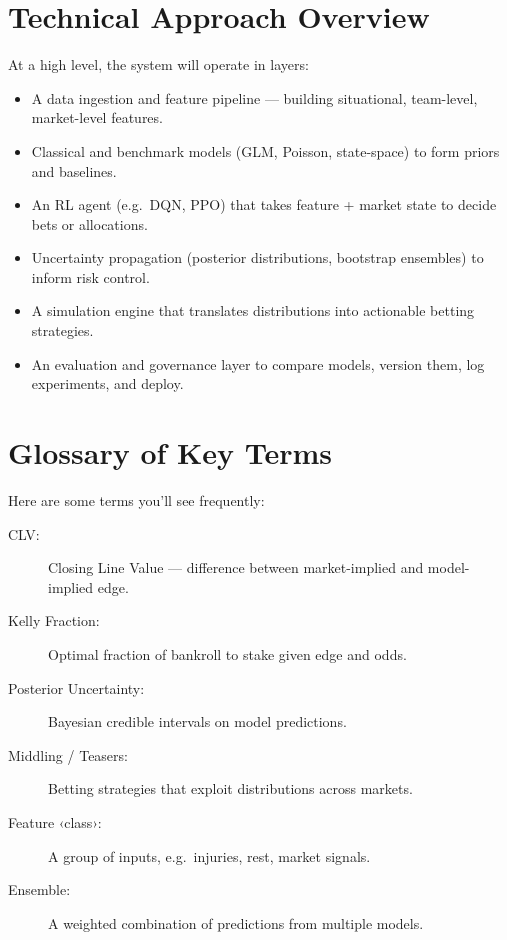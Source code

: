 \section{Technical Approach Overview}

At a high level, the system will operate in layers:

\begin{itemize}
  \item A data ingestion and feature pipeline — building situational, team-level, market-level features.
  \item Classical and benchmark models (GLM, Poisson, state-space) to form priors and baselines.
  \item An RL agent (e.g.\ DQN, PPO) that takes feature + market state to decide bets or allocations.
  \item Uncertainty propagation (posterior distributions, bootstrap ensembles) to inform risk control.
  \item A simulation engine that translates distributions into actionable betting strategies.
  \item An evaluation and governance layer to compare models, version them, log experiments, and deploy.
\end{itemize}



\section{Glossary of Key Terms}

Here are some terms you’ll see frequently:
\begin{description}
  \item[CLV:] Closing Line Value — difference between market-implied and model-implied edge.
  \item[Kelly Fraction:] Optimal fraction of bankroll to stake given edge and odds.
  \item[Posterior Uncertainty:] Bayesian credible intervals on model predictions.
  \item[Middling / Teasers:] Betting strategies that exploit distributions across markets.
  \item[Feature ‹class›:] A group of inputs, e.g.\ injuries, rest, market signals.
  \item[Ensemble:] A weighted combination of predictions from multiple models.
\end{description}


